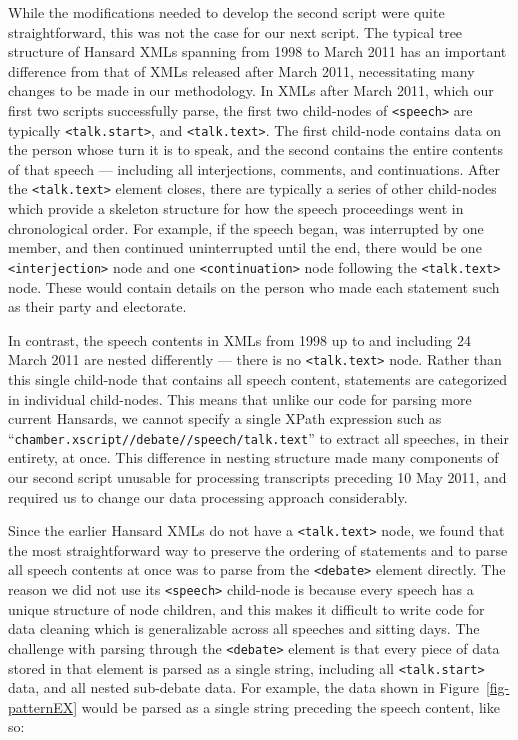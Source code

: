\documentclass[
  letterpaper,
  DIV=11,
  numbers=noendperiod]{scrartcl}
\begin{document}
While the modifications needed to develop the second script were quite
straightforward, this was not the case for our next script. The typical
tree structure of Hansard XMLs spanning from 1998 to March 2011 has an
important difference from that of XMLs released after March 2011,
necessitating many changes to be made in our methodology. In XMLs after
March 2011, which our first two scripts successfully parse, the first
two child-nodes of \texttt{\textless{}speech\textgreater{}} are
typically \texttt{\textless{}talk.start\textgreater{}}, and
\texttt{\textless{}talk.text\textgreater{}}. The first child-node
contains data on the person whose turn it is to speak, and the second
contains the entire contents of that speech --- including all
interjections, comments, and continuations. After the
\texttt{\textless{}talk.text\textgreater{}} element closes, there are
typically a series of other child-nodes which provide a skeleton
structure for how the speech proceedings went in chronological order.
For example, if the speech began, was interrupted by one member, and
then continued uninterrupted until the end, there would be one
\texttt{\textless{}interjection\textgreater{}} node and one
\texttt{\textless{}continuation\textgreater{}} node following the
\texttt{\textless{}talk.text\textgreater{}} node. These would contain
details on the person who made each statement such as their party and
electorate.

In contrast, the speech contents in XMLs from 1998 up to and including
24 March 2011 are nested differently --- there is no
\texttt{\textless{}talk.text\textgreater{}} node. Rather than this
single child-node that contains all speech content, statements are
categorized in individual child-nodes. This means that unlike our code
for parsing more current Hansards, we cannot specify a single XPath
expression such as
``\texttt{chamber.xscript//debate//speech/talk.text}'' to extract all
speeches, in their entirety, at once. This difference in nesting
structure made many components of our second script unusable for
processing transcripts preceding 10 May 2011, and required us to change
our data processing approach considerably.

Since the earlier Hansard XMLs do not have a
\texttt{\textless{}talk.text\textgreater{}} node, we found that the most
straightforward way to preserve the ordering of statements and to parse
all speech contents at once was to parse from the
\texttt{\textless{}debate\textgreater{}} element directly. The reason we
did not use its \texttt{\textless{}speech\textgreater{}} child-node is
because every speech has a unique structure of node children, and this
makes it difficult to write code for data cleaning which is
generalizable across all speeches and sitting days. The challenge with
parsing through the \texttt{\textless{}debate\textgreater{}} element is
that every piece of data stored in that element is parsed as a single
string, including all \texttt{\textless{}talk.start\textgreater{}} data,
and all nested sub-debate data. For example, the data shown in
Figure~\ref{fig-patternEX} would be parsed as a single string preceding
the speech content, like so:
\end{document}
